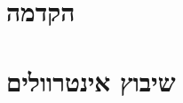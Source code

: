 \documentclass[]{article}
\def\insert#1{}
\begin{document}
\def\lecnum{5}
\def\topcis{
אלגוריתמים חמדניים
}

\section*{הקדמה}
\insert{intro}
\section*{שיבוץ אינטרוולים}
\insert{interval}
\end{document}
